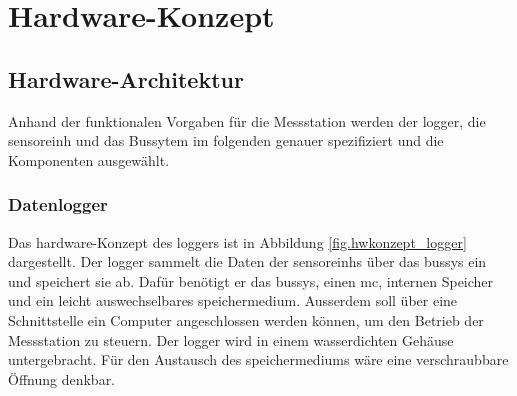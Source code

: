%
%

\chapter{Hardware-Konzept}\label{chap.hardware}


\section{Hardware-Architektur}\label{sec.hw_arch}

Anhand der funktionalen Vorgaben für die Messstation werden der \gls{logger}, die \gls{sensoreinh} und das Bussytem im folgenden genauer spezifiziert und die Komponenten ausgewählt.

\subsection{Datenlogger}
Das \gls{hardware}-Konzept des \gls{logger}s ist in Abbildung \ref{fig.hwkonzept_logger} dargestellt.
Der \gls{logger} sammelt die Daten der \glspl{sensoreinh} über das \gls{bussys} ein und speichert sie ab. Dafür benötigt er das \gls{bussys}, einen \gls{mc}, internen Speicher und ein leicht auswechselbares \gls{speichermedium}. Ausserdem soll über eine Schnittstelle ein Computer angeschlossen werden können, um den Betrieb der Messstation zu steuern. Der \gls{logger} wird in einem wasserdichten Gehäuse untergebracht. Für den Austausch des \gls{speichermedium}s wäre eine verschraubbare Öffnung denkbar.

